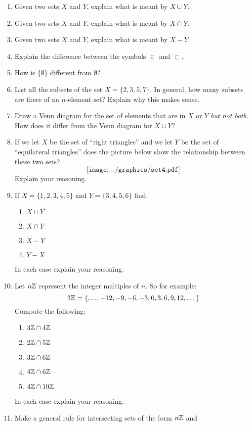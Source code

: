 \begin{problems}
\begin{enumerate}
\item Given two sets $X$ and $Y$, explain what is meant by $X\cup Y$.
\item Given two sets $X$ and $Y$, explain what is meant by $X\cap Y$.
\item Given two sets $X$ and $Y$, explain what is meant by $X - Y$.
\item Explain the difference between the symbols $\in$ and $\subset$.
\item How is $\{\emptyset\}$ different from $\emptyset$?  
\item List all the subsets of the set $X=\{2, 3, 5, 7\}$.  In general, how many 
subsets are there of an $n$-element set?  Explain why this makes sense.  
\item Draw a Venn diagram for the set of elements that are in $X$ or $Y$ \emph{but not both}. 
How does it differ from the Venn diagram for $X\cup Y$?  
\item If we let $X$ be the set of ``right triangles'' and we let $Y$ be the set of ``equilateral triangles'' does the picture below show the relationship between these two sets?
\[
\texttt{[image: ../graphics/set4.pdf]}
\]
Explain your reasoning.
\item If $X = \{1,2,3,4,5\}$ and $Y = \{3,4,5,6\}$ find:
\begin{enumerate}
\item $X\cup Y$
\item $X\cap Y$
\item $X-Y$
\item $Y-X$
\end{enumerate}
In each case explain your reasoning. 
\item Let $n\mathbb Z$ represent the integer multiples of $n$. So for example:
\[
3\mathbb Z = \{\dots,-12,-9,-6,-3,0,3,6,9,12,\dots\}
\]
Compute the following:
\begin{enumerate}
\item $3\mathbb Z\cap 4\mathbb Z$
\item $2\mathbb Z\cap 5\mathbb Z$
\item $3\mathbb Z\cap 6\mathbb Z$
\item $4\mathbb Z\cap 6\mathbb Z$
\item $4\mathbb Z\cap 10\mathbb Z$
\end{enumerate}
In each case explain your reasoning. 
\item Make a general rule for intersecting sets of the form $n\mathbb Z$ and

\end{enumerate}
\end{problems}
